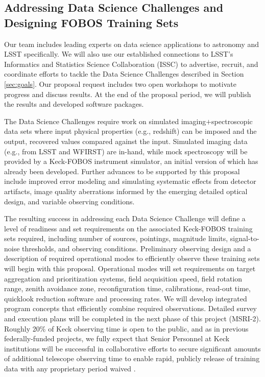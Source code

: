 \documentclass[oneside,11pt]{amsart}
\newcommand{\comment}[2][todo]{{\color{#1}[[{\bf #2}]]}}
\begin{document}


\subsection{Addressing Data Science Challenges and Designing FOBOS Training Sets}
\label{sec:survey}

Our team includes leading experts on data science applications to astronomy and LSST specifically.  We will also use
our established connections to LSST's Informatics and Statistics Science Collaboration (ISSC) to advertise, recruit,
and coordinate efforts to tackle the Data Science Challenges described in Section \ref{sec:goals}.  Our proposal
request includes two open workshops to motivate progress and discuss results. At the end of the proposal period, we
will publish the results and developed software packages.

The Data Science Challenges require work on simulated imaging$+$spectroscopic data sets where input physical properties
(e.g., redshift) can be imposed and the output, recovered values compared against the input.  Simulated imaging data
(e.g., from LSST and WFIRST) are in-hand, while mock spectroscopy will be provided by a Keck-FOBOS instrument simulator,
an initial version of which has already been developed.  Further advances to be supported by this proposal include
improved error modeling and simulating systematic effects from detector artifacts, image quality aberrations informed
by the emerging detailed optical design, and variable observing conditions.

The resulting success in addressing each Data Science Challenge will define a level of readiness and set requirements
on the associated Keck-FOBOS training sets required, including number of sources, pointings, magnitude limits,
signal-to-noise thresholds, and observing conditions.  Preliminary observing design and a description of required
operational modes to efficiently observe these training sets will begin with this proposal.  Operational modes will set
requirements on target aggregation and prioritization systems, field acquisition speed, field rotation range, zenith
avoidance zone, reconfiguration time, calibrations, read-out time, quicklook reduction software and processing rates.
We will develop integrated program concepts that efficiently combine required observations.  Detailed survey and
execution plans will be completed in the next phase of this project (MSRI-2).  Roughly 20\% of Keck observing time is
open to the public, and as in previous federally-funded projects, we fully expect that Senior Personnel at Keck
institutions will be successful in collaborative efforts to secure significant amounts of additional telescope
observing time to enable rapid, publicly release of training data with any proprietary period waived
\citep[e.g.,][]{newman13}.
\end{document}
